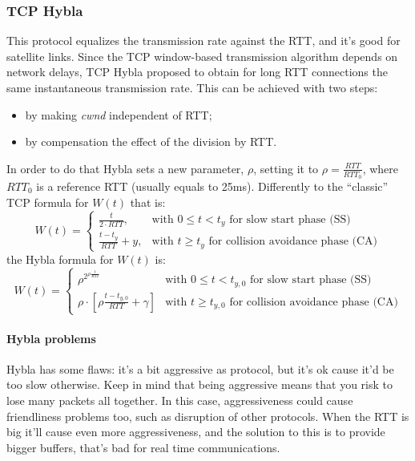 \subsubsection{TCP Hybla}
\label{prt:tcp:hybla}

This protocol equalizes the transmission rate against the RTT, and it's good for
satellite links. Since the TCP window-based transmission algorithm depends on
network delays, TCP Hybla proposed to obtain for long RTT connections the same
instantaneous transmission rate. This can be achieved with two steps:
\begin{itemize}
	\item by making \emph{cwnd} independent of RTT;
	\item by compensation the effect of the division by RTT.
\end{itemize}

In order to do that Hybla sets a new parameter, $\rho$,
setting it to $\rho = \frac{RTT}{RTT_0}$, where $RTT_0$ is a reference RTT
(usually equals to 25ms).
Differently to the ``classic'' TCP formula for $W(t)$ that is:
\begin{equation*}
  W(t) = \begin{cases}
    \frac{t}{2 \cdot RTT}, & \mbox{with } 0 \le t < t_y \mbox{ for slow start phase (SS)} \\
    \frac{t - t_y}{RTT} + y, & \mbox{with } t \ge t_y \mbox{ for collision avoidance phase (CA)}
  \end{cases}
\end{equation*}
the Hybla formula for $W(t)$ is:
\begin{equation}
  W(t) = \begin{cases}
    \rho^{2^{\rho \frac{t}{RTT}}} & \mbox{with } 0 \le t < t_{y,0} \mbox{ for slow start phase (SS)} \\
    \rho \cdot \left [\rho\frac{t - t_{y,0}}{RTT} + \gamma \right ] & \mbox{with } t \ge t_{y,0} \mbox{ for collision avoidance phase (CA)}
  \end{cases}
\end{equation}

\paragraph*{Hybla problems} Hybla has some flaws: it's a bit aggressive as
protocol, but it's ok cause it'd be too slow otherwise. Keep in mind that being
aggressive means that you risk to lose many packets all together. In this case,
aggressiveness could cause friendliness problems too, such as disruption of
other protocols.
When the RTT is big it'll cause even more aggressiveness, and the solution to
this is to provide bigger buffers, that's bad for real time communications.

